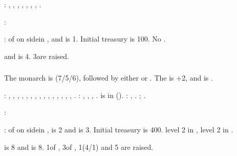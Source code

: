 : \provinceMoskva, \provinceKaluga,
\provinceNovgorod, \provinceNeva, \provinceOnega, \provinceLadoga,
\provinceYaroslavl, \provinceVyatka.

:
\begin{modlist}
\item[\MA] \paysKazan
\item[\RM] \paysCrimee
\end{modlist}

:
\bparag \MNU of  on side\facemoins in \provinceNovgorod, \FTI and
\DTI is 1.
\bparag Initial treasury is 100\ducats.
\bparag No \TradeFLEET.

\aparag {} and  is
4. 3\ARMY\faceplus are raised.


\subsubsection{\paysmajeurTurquie}
\aparag The monarch is  (7/5/6), followed by either
 or \monarqueSuleyman. The \STAB is +2, and \TUR is
.

: \provinceTrakya, \provinceCanakkale,
\provinceIzmir, \provinceBursa, \provinceMakedonya, \provinceBulgaristan,
\provinceKosovo, \provinceRumeli, \provinceKocaeli, \provinceTrabzon,
\provinceAngora, \provinceSinop, \provinceAntalya, \provinceKonya,
\provinceAnadolu, \provinceKilikya.
: \provinceAlabania, \provinceHellas, \provinceMoreas,
\provinceCaffa.
  is in  (\villeMecca).
: \seazoneRouge, \seazonePersique.
; .

:
\begin{modlist}
\item[\RM] \paysmoldavie
\item[\VASSAL] \paysvalachie
\end{modlist}

:
\bparag \MNU of  on side\facemoins in \provinceTrakya, \FTI is 2 and
\DTI is 3.
\bparag Initial treasury is 400\ducats.
\bparag \TradeFLEET level 2 in , level 2 in .

\aparag {} is 8 and  is
8. 1\ARMY\facemoins of \Janissaire, 3\ARMY\faceplus of \Timar,
1\FLEET\facemoins (4\NGD/1\NTD) and 5 \Pashas are raised.


